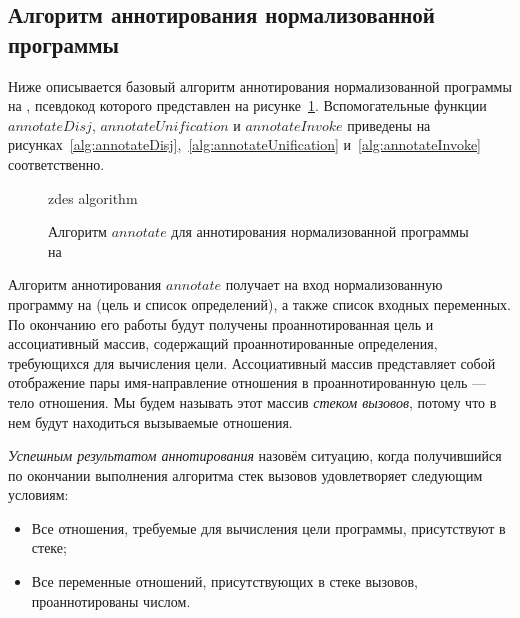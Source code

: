 \subsection{Алгоритм аннотирования нормализованной программы}
\label{lab:coreAnn}

Ниже описывается базовый алгоритм аннотирования нормализованной программы на \miniKanren{}, псевдокод которого представлен на рисунке~\ref{alg:annotate}.
Вспомогательные функции $annotateDisj$, $annotateUnification$ и $annotateInvoke$ приведены на рисунках~\ref{alg:annotateDisj},~\ref{alg:annotateUnification} и~\ref{alg:annotateInvoke} соответственно.

\begin{figure}[h!]
  \begin{center}
  \begin{minipage}{1.1\textwidth}
\begin{algorithm}[H]
  zdes algorithm
\end{algorithm}
  \end{minipage}
  \end{center}
  \caption{Алгоритм $annotate$ для аннотирования нормализованной программы на \miniKanren{}}
  \label{alg:annotate}
\end{figure}

Алгоритм аннотирования $annotate$ получает на вход нормализованную программу на \miniKanren{} (цель и список определений), а также список входных переменных.
По окончанию его работы будут получены проаннотированная цель и ассоциативный массив, содержащий проаннотированные определения, требующихся для вычисления цели.
Ассоциативный массив представляет собой отображение пары имя-направление отношения в проаннотированную цель --- тело отношения.
Мы будем называть этот массив \emph{стеком вызовов}, потому что в нем будут находиться вызываемые отношения.

\emph{Успешным результатом аннотирования} назовём ситуацию, когда получившийся по окончании выполнения алгоритма стек вызовов удовлетворяет следующим условиям:
\begin{itemize}
    \item Все отношения, требуемые для вычисления цели программы, присутствуют в стеке;
    \item Все переменные отношений, присутствующих в стеке вызовов, проаннотированы числом.
\end{itemize}

